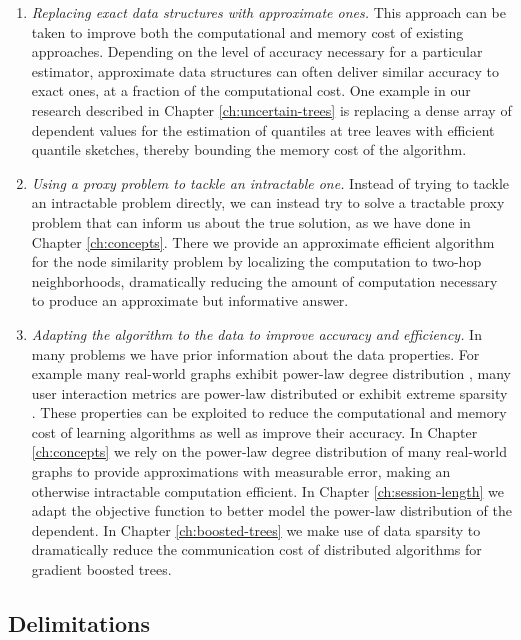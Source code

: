 \begin{enumerate}
	\item \emph{Replacing exact data structures with approximate ones.} This approach can be taken
	to improve both the computational and memory cost of existing approaches. Depending on the
	level of accuracy necessary for a particular estimator, approximate data structures
	can often deliver similar accuracy to exact ones, at a fraction of the computational cost.
	One example in our research described in Chapter \ref{ch:uncertain-trees} is replacing a dense array of dependent values for the
	estimation of quantiles at tree leaves with efficient quantile sketches\cite{karnin2016kll}, thereby bounding the
	memory cost of the algorithm.
	\item \emph{Using a proxy problem to tackle an intractable one.} Instead of trying to
	tackle an intractable problem directly, we can instead try to solve a
	tractable proxy problem that can inform us about the true solution, as we have done
	in Chapter \ref{ch:concepts}. There we provide an approximate efficient algorithm for the node similarity problem by localizing the computation to two-hop neighborhoods, dramatically reducing the
	amount of computation necessary to produce an approximate but informative answer.
	\item \emph{Adapting the algorithm to the data to improve accuracy and efficiency.} In many problems
	we have prior information about the data properties. For example many real-world graphs exhibit
	power-law degree distribution \cite{small-world, barabasi-small-world}, many user interaction metrics are power-law
	distributed \cite{phonecalls, faloutsos1999internet, click-stream-power-law} or exhibit extreme sparsity \cite{esl}. These properties can
	be exploited to reduce the computational and memory cost of learning algorithms as well as
	improve their accuracy. In Chapter \ref{ch:concepts} we rely on the power-law degree
	distribution of many real-world graphs to provide approximations with measurable error,
	making an otherwise intractable computation efficient. In Chapter \ref{ch:session-length}
	we adapt the objective function to better model the power-law distribution of the dependent.
	In Chapter \ref{ch:boosted-trees} we make use of data sparsity to dramatically reduce
	the communication cost of distributed algorithms for gradient boosted trees.
\end{enumerate}

\subsection{Delimitations}


